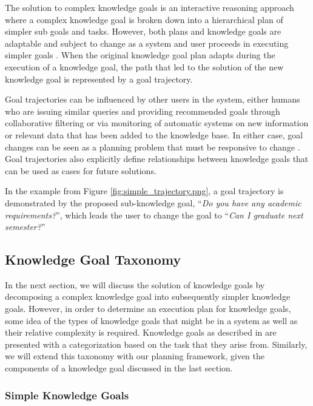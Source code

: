 \documentclass[11pt,letterpaper]{article}
\begin{document}
The solution to complex knowledge goals is an interactive reasoning approach where a complex knowledge goal is broken down into a hierarchical plan of simpler sub goals and tasks. However, both plans and knowledge goals are adaptable and subject to change as a system and user proceeds in executing simpler goals \cite{munoz-avila_case-based_2008}. When the original knowledge goal plan adapts during the execution of a knowledge goal, the path that led to the solution of the new knowledge goal is represented by a goal trajectory.

Goal trajectories can be influenced by other users in the system, either humans who are issuing similar queries and providing recommended goals through collaborative filtering \cite{hayes_case-based_2001} or via monitoring of automatic systems on new information or relevant data that has been added to the knowledge base. In either case, goal changes can be seen as a planning problem that must be responsive to change \cite{cox_mixed-initiative_2007}. Goal trajectories also explicitly define relationships between knowledge goals that can be used as cases for future solutions.

In the example from Figure \ref{fig:simple_trajectory.png}, a goal trajectory is demonstrated by the proposed sub-knowledge goal, ``\textit{Do you have any academic requirements?}'', which leads the user to change the goal to ``\textit{Can I graduate next semester?}''

\subsection{Knowledge Goal Taxonomy} \label{ssec:taxonomy}

In the next section, we will discuss the solution of knowledge goals by decomposing a complex knowledge goal into subsequently simpler knowledge goals. However, in order to determine an execution plan for knowledge goals, some idea of the types of knowledge goals that might be in a system as well as their relative complexity is required. Knowledge goals as described in \cite{ram_knowledge_1990,ram_goal-based_1991} are presented with a categorization based on the task that they arise from. Similarly, we will extend this taxonomy with our planning framework, given the components of a knowledge goal discussed in the last section.

\subsubsection{Simple Knowledge Goals}
\end{document}
